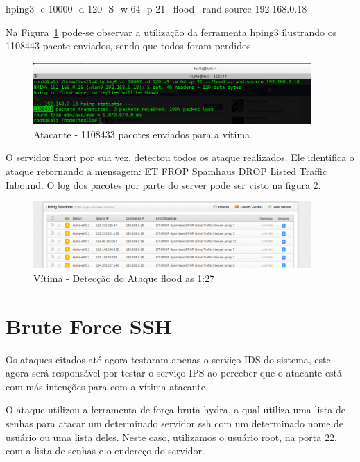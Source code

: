 \begin{framed}
	hping3 -c 10000 -d 120 -S -w 64 -p 21 --flood --rand-source 192.168.0.18
\end{framed}

	Na Figura~\ref{fig:atacante_hping3} pode-se observar a utilização da ferramenta hping3 ilustrando
	os 1108443 pacote enviados, sendo que todos foram perdidos.

	 \begin{figure}[h]
 	 \centering
 	 \includegraphics[width=400px, scale=1]{resource/atacante_hping3}
 	 \caption{Atacante - 1108433 pacotes enviados para a vítima}
  \label{fig:atacante_hping3}
  \end{figure}

	O servidor Snort por sua vez, detectou todos os ataque realizados. Ele identifica
	o ataque retornando a mensagem: ET FROP Spamhaus DROP Listed Traffic Inbound. O
	log dos pacotes por parte do server pode ser visto na figura \ref{fig:vitima_flood}.

	 \begin{figure}[h]
 	 \centering
 	 \includegraphics[width=400px, scale=1]{resource/vitima_flood}
 	 \caption{Vítima - Detecção do Ataque flood as 1:27}
  \label{fig:vitima_flood}
  \end{figure}

\section{Brute Force SSH}
\label{sec:Brute Force SSH}
	Os ataques citados até agora testaram apenas o serviço IDS do sistema, este agora
	será responsável por testar o serviço IPS ao perceber que o atacante está com más
	intenções para com a vítima atacante.

	O ataque utilizou a ferramenta de força bruta hydra, a qual utiliza uma lista
	de senhas para atacar um determinado servidor ssh com um determinado nome de
	usuário ou uma lista deles. Neste caso, utilizamos o usuário root, na porta 22,
	com a lista de senhas e o endereço do servidor.

